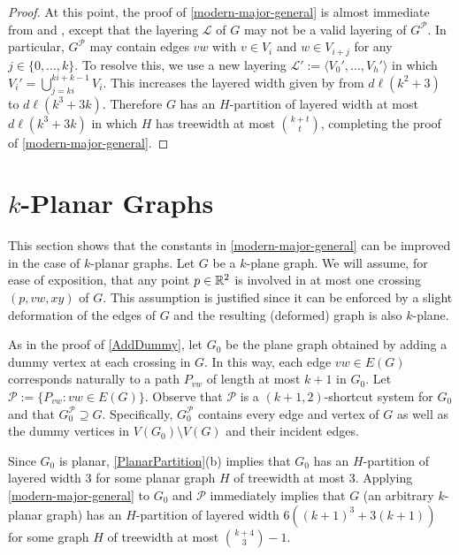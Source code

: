 \documentclass{patmorin}
\newcommand{\PP}{\mathcal{P}}
\begin{document}
\begin{proof}
  At this point, the proof of \cref{modern-major-general} is almost immediate from  and , except that the layering $\mathcal{L}$ of $G$ may not be a valid layering of $G^{\mathcal{P}}$.  In particular, $G^{\mathcal{P}}$ may contain edges $vw$ with $v\in V_i$ and $w\in V_{i+j}$ for any $j\in\{0,\ldots,k\}$.  To resolve this, we use a new layering $\mathcal{L}':=\langle V_0',\ldots,V_h'\rangle$ in which $V_i'=\bigcup_{j=ki}^{ki+k-1} V_i$.  This increases the layered width given by  from $d\ell(k^2+3)$ to $d\ell(k^3+3k)$.  Therefore $G$ has an $H$-partition of layered width at most $d\ell(k^3+3k)$ in which $H$ has treewidth at most $\binom{k+t}{t}$, completing the proof of \cref{modern-major-general}.
\end{proof}

\section{\boldmath $k$-Planar Graphs}
\label{sec-k-planar}

This section shows that the constants in \cref{modern-major-general} can be improved in the case of $k$-planar graphs. Let $G$ be a $k$-plane graph.  We will assume, for ease of exposition, that any point $p\in\mathbb{R}^2$ is involved in at most one crossing $(p,vw,xy)$ of $G$. This assumption is justified since it can be enforced by a slight deformation of the edges of $G$ and the resulting (deformed) graph is also $k$-plane.  

As in the proof of \cref{AddDummy}, let $G_0$ be the plane graph obtained by adding a dummy vertex at each crossing in $G$. In this way, each edge $vw\in E(G)$ corresponds naturally to a path $P_{vw}$ of length at most $k+1$ in $G_0$.  Let $\PP := \{P_{vw}: vw\in E(G)\}$. Observe that $\PP$ is a $(k+1,2)$-shortcut system for $G_0$ and that $G_0^{\mathcal{P}}\supseteq G$.  Specifically, $G_0^{\mathcal{P}}$ contains every edge and vertex of $G$ as well as the dummy vertices in $V(G_0)\setminus V(G)$ and their incident edges.  

Since $G_0$ is planar,  \cref{PlanarPartition}(b) implies that $G_0$ has an $H$-partition of layered width 3 for some planar graph $H$ of treewidth at most 3.  Applying \cref{modern-major-general} to $G_0$ and $\mathcal{P}$ immediately implies that $G$ (an arbitrary $k$-planar graph) has an $H$-partition of layered width $6((k+1)^3+3(k+1))$ for some graph $H$ of treewidth at most $\binom{k+4}{3}-1$.
\end{document}
